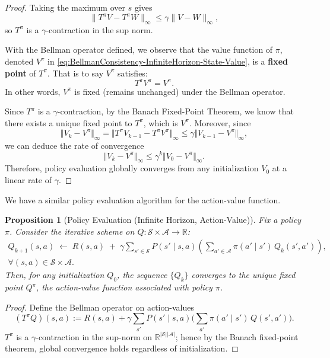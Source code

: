 \documentclass[
]{book}
\newtheorem{proposition}{Proposition}[chapter]
\theoremstyle{definition}
\theoremstyle{definition}
\theoremstyle{definition}
\theoremstyle{definition}
\theoremstyle{remark}
\begin{document}
\begin{proof}
Taking the maximum over \(s\) gives
\[
\|T^\pi V - T^\pi W\|_\infty \le \gamma \|V - W\|_\infty,
\]
so \(T^\pi\) is a \(\gamma\)-contraction in the sup norm.

With the Bellman operator defined, we observe that the value function of \(\pi\), denoted \(V^{\pi}\) in \eqref{eq:BellmanConsistency-InfiniteHorizon-State-Value}, is a \textbf{fixed point} of \(T^{\pi}\). That is to say \(V^{\pi}\) satisfies:
\[
T^{\pi} V^{\pi} = V^{\pi}.
\]
In other words, \(V^{\pi}\) is fixed (remains unchanged) under the Bellman operator.

Since \(T^{\pi}\) is a \(\gamma\)-contraction, by the Banach Fixed-Point Theorem, we know that there exists a unique fixed point to \(T^{\pi}\), which is \(V^{\pi}\). Moreover, since
\[
\Vert V_{k} - V^{\pi} \Vert_{\infty} = \Vert T^{\pi} V_{k-1} - T^{\pi} V^{\pi} \Vert_{\infty} \leq \gamma \Vert V_{k-1} - V^{\pi} \Vert_{\infty},
\]
we can deduce the rate of convergence
\[
\Vert V_{k} - V^{\pi} \Vert_{\infty} \leq \gamma^{k} \Vert V_0 - V^{\pi} \Vert_{\infty}.
\]
Therefore, policy evaluation globally converges from any initialization \(V_0\) at a linear rate of \(\gamma\).
\end{proof}

We have a similar policy evaluation algorithm for the action-value function.

\begin{proposition}[Policy Evaluation (Infinite Horizon, Action-Value)]
\protect\hypertarget{prp:PolicyEvaluationInfiniteHorizonActionValue}{}\label{prp:PolicyEvaluationInfiniteHorizonActionValue}Fix a policy \(\pi\). Consider the iterative scheme on \(Q:\mathcal{S}\times\mathcal{A}\to\mathbb{R}\):
\begin{equation}
\begin{split}
Q_{k+1}(s,a) \;\gets\; R(s,a)
\;+\; \gamma \sum_{s'\in\mathcal{S}} P(s'\mid s,a)\!\left(\sum_{a'\in\mathcal{A}} \pi(a'\mid s')\, Q_k(s',a')\right), 
\\
\forall (s,a)\in\mathcal{S}\times\mathcal{A}.
\end{split}
\label{eq:PolicyEvaluationInfiniteHorizonActionValue}
\end{equation}
Then, for any initialization \(Q_0\), the sequence \(\{Q_k\}\) converges to the unique fixed point \(Q^{\pi}\), the action-value function associated with policy \(\pi\).
\end{proposition}

\begin{proof}
Define the Bellman operator on action-values
\[
(T^{\pi}Q)(s,a) := R(s,a) + \gamma \sum_{s'} P(s'\mid s,a)\Big(\sum_{a'} \pi(a'\mid s')\, Q(s',a')\Big).
\]
\(T^{\pi}\) is a \(\gamma\)-contraction in the sup-norm on \(\mathbb{R}^{|\mathcal{S}||\mathcal{A}|}\); hence by the Banach fixed-point theorem, global convergence holds regardless of initialization.
\end{proof}
\end{document}
